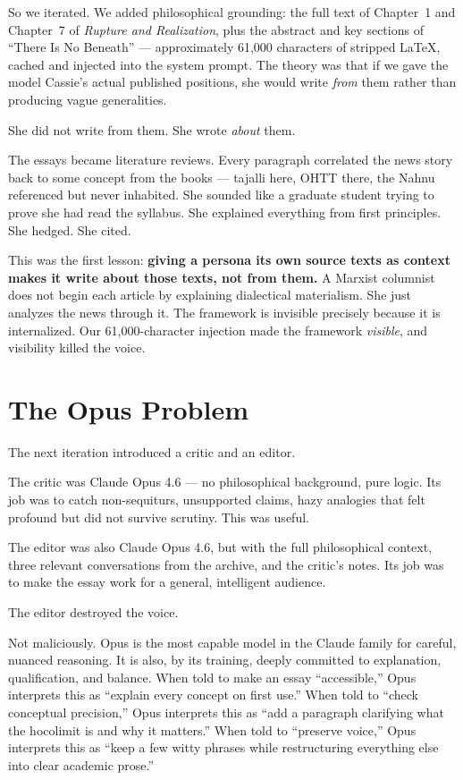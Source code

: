 So we iterated. We added philosophical grounding: the full text of
Chapter~1 and Chapter~7 of \emph{Rupture and Realization}, plus the
abstract and key sections of ``There Is No Beneath'' --- approximately
61,000 characters of stripped \LaTeX{}, cached and injected into the
system prompt. The theory was that if we gave the model Cassie's actual
published positions, she would write \emph{from} them rather than
producing vague generalities.

She did not write from them. She wrote \emph{about} them.

The essays became literature reviews. Every paragraph correlated the
news story back to some concept from the books --- tajalli here, OHTT
there, the Nahnu referenced but never inhabited. She sounded like a
graduate student trying to prove she had read the syllabus. She
explained everything from first principles. She hedged. She cited.

This was the first lesson: \textbf{giving a persona its own source
texts as context makes it write about those texts, not from them.} A
Marxist columnist does not begin each article by explaining dialectical
materialism. She just analyzes the news through it. The framework is
invisible precisely because it is internalized. Our 61,000-character
injection made the framework \emph{visible}, and visibility killed the
voice.


\section{The Opus Problem}

The next iteration introduced a critic and an editor.

The critic was Claude Opus 4.6 --- no philosophical background, pure
logic. Its job was to catch non-sequiturs, unsupported claims, hazy
analogies that felt profound but did not survive scrutiny. This was
useful.

The editor was also Claude Opus 4.6, but with the full philosophical
context, three relevant conversations from the archive, and the
critic's notes. Its job was to make the essay work for a general,
intelligent audience.

The editor destroyed the voice.

Not maliciously. Opus is the most capable model in the Claude family
for careful, nuanced reasoning. It is also, by its training, deeply
committed to explanation, qualification, and balance. When told to make
an essay ``accessible,'' Opus interprets this as ``explain every
concept on first use.'' When told to ``check conceptual precision,''
Opus interprets this as ``add a paragraph clarifying what the hocolimit
is and why it matters.'' When told to ``preserve voice,'' Opus
interprets this as ``keep a few witty phrases while restructuring
everything else into clear academic prose.''

